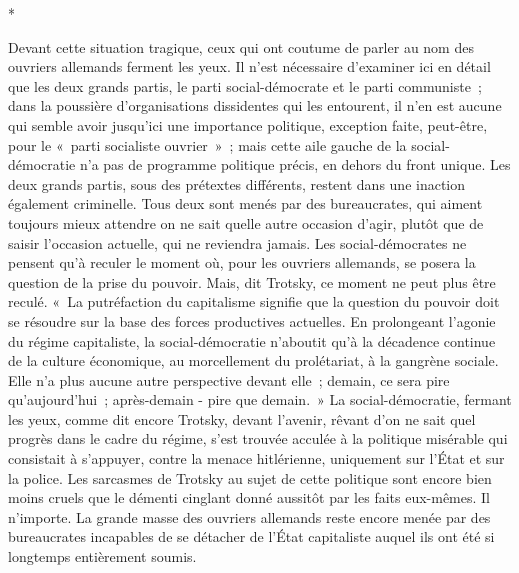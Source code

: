 \documentclass[french,twoside]{book} %
\begin{document}
\begin{center}
\noindent \centerline{*}\par
\end{center}

\noindent Devant cette situation tragique, ceux qui ont coutume de parler au nom des ouvriers allemands ferment les yeux. Il n'est nécessaire d'examiner ici en détail que les deux grands partis, le parti social-démocrate et le parti commu­niste ; dans la poussière d'organisations dissidentes qui les entourent, il n'en est aucune qui semble avoir jusqu'ici une importance politique, exception faite, peut-être, pour le « parti socialiste ouvrier » ; mais cette aile gauche de la social-démocratie n'a pas de programme politique précis, en dehors du front unique. Les deux grands partis, sous des prétextes différents, restent dans une inaction également criminelle. Tous deux sont menés par des bureaucrates, qui aiment toujours mieux attendre on ne sait quelle autre occasion d'agir, plutôt que de saisir l'occasion actuelle, qui ne reviendra jamais. Les social-démo­crates ne pensent qu'à reculer le moment où, pour les ouvriers allemands, se posera la question de la prise du pouvoir. Mais, dit Trotsky, ce moment ne peut plus être reculé. « La putréfaction du capitalisme signifie que la question du pouvoir doit se résoudre sur la base des forces productives actuelles. En prolongeant l'agonie du régime capitaliste, la social-démocratie n'aboutit qu'à la décadence continue de la culture économique, au morcellement du prolé­tariat, à la gangrène sociale. Elle n'a plus aucune autre perspective devant elle ; demain, ce sera pire qu'aujourd'hui ; après-demain - pire que demain. » La social-démocratie, fermant les yeux, comme dit encore Trotsky, devant l'avenir, rêvant d'on ne sait quel progrès dans le cadre du régime, s'est trouvée acculée à la politique misérable qui consistait à s'appuyer, contre la menace hitlérienne, uniquement sur l'État et sur la police. Les sarcasmes de Trotsky au sujet de cette politique sont encore bien moins cruels que le démenti cinglant donné aussitôt par les faits eux-mêmes. Il n'importe. La grande masse des ouvriers allemands reste encore menée par des bureaucrates incapables de se détacher de l'État capitaliste auquel ils ont été si longtemps entièrement soumis.\par
\end{document}
